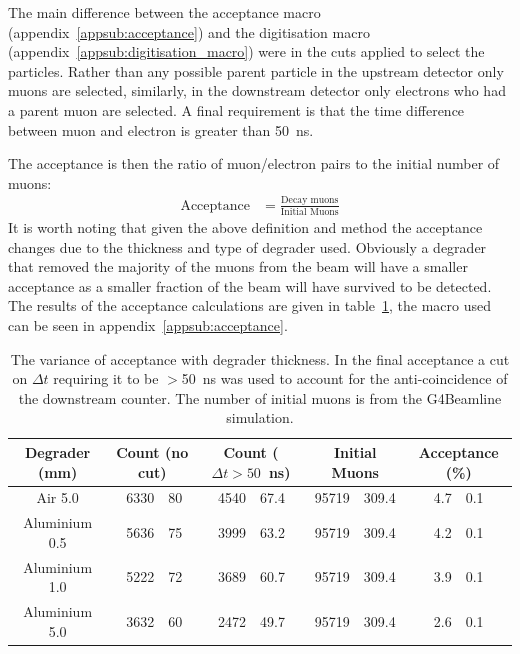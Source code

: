 The main difference between the acceptance macro (appendix~\ref{appsub:acceptance}) and the digitisation macro (appendix~\ref{appsub:digitisation_macro}) were in the cuts applied to select the particles. Rather than any possible parent particle in the upstream detector only muons are selected, similarly, in the downstream detector only electrons who had a parent muon are selected. A final requirement is that the time difference between muon and electron is greater than 50~ns.

The acceptance is then the ratio of muon/electron pairs to the initial number of muons:
\begin{align}
    \text{Acceptance} &= \frac{\text{Decay muons}}{\text{Initial Muons}} \label{equ:acceptance}
\end{align}
It is worth noting that given the above definition and method the acceptance changes due to the thickness and type of degrader used. Obviously a degrader that removed the majority of the muons from the beam will have a smaller acceptance as a smaller fraction of the beam will have survived to be detected. The results of the acceptance calculations are given in table~\ref{tab:acceptance}, the macro used can be seen in appendix~\ref{appsub:acceptance}.
\begin{table}
    \begin{center}
    \begin{tabular}{c| r@{ $\pm$ }l | r@{ $\pm$ }l | r@{ $\pm$ }l | r@{ $\pm$ }l }
        Degrader (mm) & \multicolumn{2}{|c}{Count (no cut)} &
                        \multicolumn{2}{|c}{Count ($\Delta t>50$~ns)} &
                        \multicolumn{2}{|c}{Initial Muons} &
                        \multicolumn{2}{|c}{Acceptance (\%)}\\
        \hline
              Air 5.0 & 6330 & 80 & 4540 & 67.4 & 95719 & 309.4 & 4.7 & 0.1\\
        Aluminium 0.5 & 5636 & 75 & 3999 & 63.2 & 95719 & 309.4 & 4.2 & 0.1\\
        Aluminium 1.0 & 5222 & 72 & 3689 & 60.7 & 95719 & 309.4 & 3.9 & 0.1\\
        Aluminium 5.0 & 3632 & 60 & 2472 & 49.7 & 95719 & 309.4 & 2.6 & 0.1\\
        
    \end{tabular}
    \end{center}
    \caption{The variance of acceptance with degrader thickness. In the final acceptance a cut on $\Delta t$ requiring it to be $>$50~ns was used to account for the anti-coincidence of the downstream counter. The number of initial muons is from the G4Beamline simulation.}
    \label{tab:acceptance}
\end{table}
